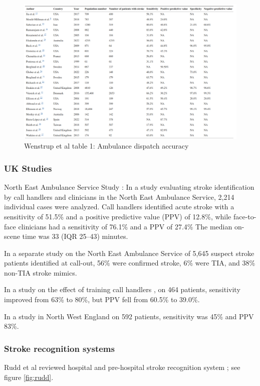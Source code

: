 \begin{figure}
    \centering
    \includegraphics[width=0.75\linewidth]{images_background/wenstrup.png}
    \caption{Wenstrup et al table 1: Ambulance dispatch accuracy}
    \label{fig:wenstrup}
\end{figure}

\subsubsection{UK Studies}

North East Ambulance Service Study \cite{mcclelland_ambulance_2021}: In a study evaluating stroke identification by call handlers and clinicians in the North East Ambulance Service, 2,214 individual cases were analyzed. Call handlers identified acute stroke with a sensitivity of 51.5\% and a positive predictive value (PPV) of 12.8\%, while face-to-face clinicians had a sensitivity of 76.1\% and a PPV of 27.4\% The median on-scene time was 33 (IQR 25–43) minutes.

In a separate study on the North East Ambulance Service \cite{mcclelland_positive_2020} of 5,645 suspect stroke patients identified at call-out, 56\% were confirmed stroke, 6\% were TIA, and 38\% non-TIA stroke mimics.

In a study on the effect of training call handlers \cite{watkins_training_2013}, on 464 patients, sensitivity improved from 63\% to 80\%, but PPV fell from 60.5\% to 39.0\%. 

In a study in North West England \cite{jones_identification_2013} on 592 patients, sensitivity was 45\% and PPV 83\%.

\subsubsection{Stroke recognition systems}

Rudd et al reviewed hospital and pre-hospital stroke recognition system \cite{rudd_systematic_2016}; see figure \ref{fig:rudd}.

